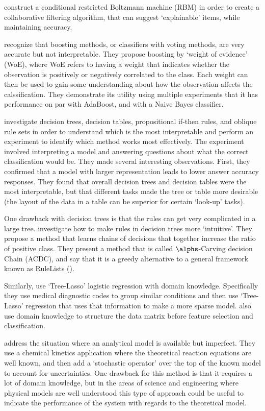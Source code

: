     \cite{Abdollahi2016-vn} construct a conditional restricted Boltzmann machine (RBM) in order to create a collaborative filtering algorithm, that can suggest `explainable' items, while maintaining accuracy. 

    \cite{Ridgeway1998-lv} recognize that boosting methods, or classifiers with voting methods, are very accurate but not interpretable. They propose boosting by `weight of evidence' (WoE), where WoE refers to having a weight that indicates whether the observation is positively or negatively correlated to the class. Each weight can then be used to gain some understanding about how the observation affects the calssification. They demonstrate its utility using multiple experiments that it has performance on par with AdaBoost, and with a Naive Bayes classifier. 

    \citet{Huysmans2011-th} investigate decision trees, decision tables, propositional if-then rules, and oblique rule sets in order to understand which is the most interpretable and perform an experiment to identify which method works most effectively. The experiment involved interpreting a model and answering questions about what the correct classification would be. They made several interesting observations. First, they confirmed that a model with larger representation leads to lower answer accuracy responses. They found that overall decision trees and decision tables were the most interpretable, but that different tasks made the tree or table more desirable (the layout of the data in a table can be superior for certain `look-up' tasks).

    One drawback with decision trees is that the rules can get very complicated in a large tree. \citet{Park2016-ld} investigate how to make rules in decision trees more `intuitive'. They propose a method that learns chains of decisions that together increase the ratio of positive class. They present a method that is called $\alphs$-Carving decision Chain (ACDC), and say that it is a greedy alternative to a general framework known as RuleLists (\citet{Wang2015-ww}). 


    Similarly, \citet{Jovanovic2016-gw} use `Tree-Lasso' logistic regression with domain knowledge. Specifically they use medical diagnostic codes to group similar conditions and then use `Tree-Lasso' regression that uses that information to make a more sparse model. \citet{Zycinski2012-jj} also use domain knowledge to structure the data matrix before feature selection and classification. 

    \cite{Morrison2016-fz} address the situation where an analytical model is available but imperfect. They use a chemical kinetics application where the theoretical reaction equations are well known, and then add a `stochastic operator' over the top of the known model to account for uncertainties. One drawback for this method is that it requires a lot of domain knowledge, but in the areas of science and engineering where physical models are well understood this type of approach could be useful to indicate the performance of the system with regards to the theoretical model.

